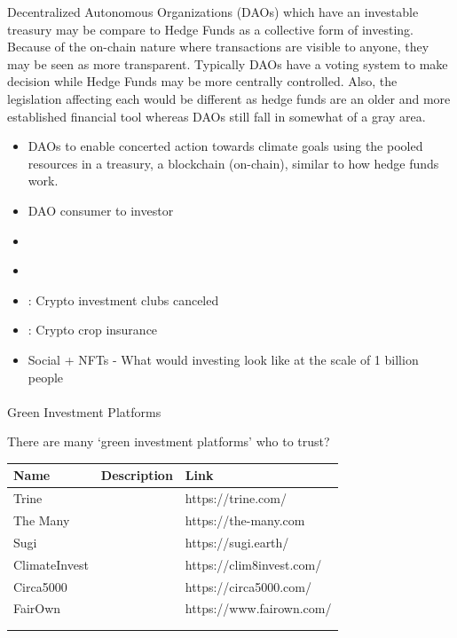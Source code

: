 \documentclass[
  letterpaper,
  DIV=11,
  numbers=noendperiod]{scrartcl}
\makeatletter
\let\oldparagraph\paragraph
\renewcommand{\paragraph}{
    \@ifstar
      \xxxParagraphStar
      \xxxParagraphNoStar
  }
\newcommand{\xxxParagraphStar}[1]{\oldparagraph*{#1}\mbox{}}
\newcommand{\xxxParagraphNoStar}[1]{\oldparagraph{#1}\mbox{}}
\makeatother
\begin{document}
Decentralized Autonomous Organizations (DAOs) which have an investable
treasury may be compare to Hedge Funds as a collective form of
investing. Because of the on-chain nature where transactions are visible
to anyone, they may be seen as more transparent. Typically DAOs have a
voting system to make decision while Hedge Funds may be more centrally
controlled. Also, the legislation affecting each would be different as
hedge funds are an older and more established financial tool whereas
DAOs still fall in somewhat of a gray area.

\begin{itemize}
\item
  \citet{TreesFuture2023} DAOs to enable concerted action towards
  climate goals using the pooled resources in a treasury, a blockchain
  (on-chain), similar to how hedge funds work.
\item
  \citet{carrawuInvestingFriendsBenefits2021} DAO consumer to investor
\item
  \citet{lucasmatneyVCbackedDAOStartups2022}
\item
  \citet{blockchannelWhatDAOHow2017}
\item
  \citet{InvestmentClubsCollectives}: Crypto investment clubs canceled
\item
  \citet{IBISANetworkEnabling}: Crypto crop insurance
\item
  Social + NFTs - What would investing look like at the scale of 1
  billion people
\end{itemize}

\paragraph{Green Investment Platforms}\label{green-investment-platforms}

There are many `green investment platforms' who to trust?

\begin{longtable}[]{@{}lll@{}}
\toprule\noalign{}
Name & Description & Link \\
\midrule\noalign{}
\endhead
\bottomrule\noalign{}
\endlastfoot
Trine & & https://trine.com/ \\
The Many & & https://the-many.com \\
Sugi & & https://sugi.earth/ \\
ClimateInvest & & https://clim8invest.com/ \\
Circa5000 & & https://circa5000.com/ \\
FairOwn & & https://www.fairown.com/ \\
& & \\
& & \\
\end{longtable}
\end{document}
